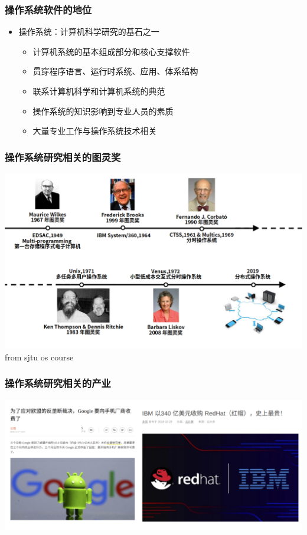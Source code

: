 \begin{frame}
    \frametitle{操作系统软件的地位}
    \begin{itemize}
        \item 操作系统：计算机科学研究的基石之一
        \begin{itemize}
            \item 计算机系统的基本组成部分和核心支撑软件
            \item 贯穿程序语言、运行时系统、应用、体系结构
            \item 联系计算机科学和计算机系统的典范
            \item 操作系统的知识影响到专业人员的素质
            \item 大量专业工作与操作系统技术相关
        \end{itemize}
    \end{itemize}
\end{frame}
\begin{frame}
    \frametitle{操作系统研究相关的图灵奖}
     \includegraphics[width=1.0\linewidth]{turing-os}
     from sjtu os course
\end{frame}

\begin{frame}
    \frametitle{操作系统研究相关的产业}
     \includegraphics[width=1.0\linewidth]{companies-os}
\end{frame}

